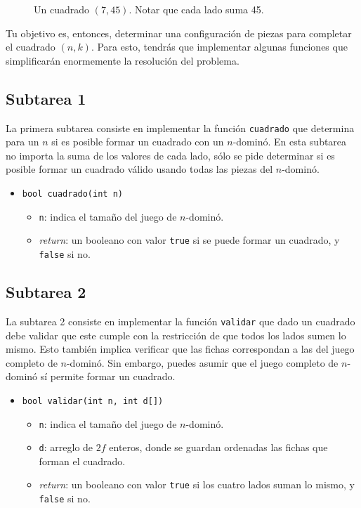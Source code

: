 \documentclass{oci}
\begin{document}
\begin{problemDescription}
\begin{figure}[ht]
 \centering
 
 \caption{Un cuadrado $(7,45)$. Notar que cada lado suma 45.}
 \label{f:cuadrado7}
\end{figure}

Tu objetivo es, entonces, determinar una configuración de piezas para completar el cuadrado $(n,k)$.
Para esto, tendrás que implementar algunas funciones que simplificarán enormemente la resolución del problema.


\end{problemDescription}

\subsection*{Subtarea 1}
La primera subtarea consiste en implementar la función \verb+cuadrado+ que determina para un $n$ si es posible formar un cuadrado con un $n$-dominó.
En esta subtarea no importa la suma de los valores de cada lado, sólo se pide determinar si es posible formar un cuadrado válido usando todas las piezas del $n$-dominó.

\begin{itemize}
 \item \verb+bool cuadrado(int n)+
 \begin{itemize}
  \item \verb+n+: indica el tamaño del juego de $n$-dominó.
  \item \emph{return}: un booleano con valor \verb+true+ si se puede formar un cuadrado, y \verb+false+ si no.
 \end{itemize}
\end{itemize}

\subsection*{Subtarea 2}
La subtarea 2 consiste en implementar la función \verb+validar+ que dado un cuadrado debe validar que este cumple con la restricción de que todos los lados sumen lo mismo.
Esto también implica verificar que las fichas correspondan a las del juego completo de $n$-dominó.
Sin embargo, puedes asumir que el juego completo de $n$-dominó sí permite formar un cuadrado.

\begin{itemize}
 \item \verb+bool validar(int n, int d[])+
 \begin{itemize}
  \item \verb+n+: indica el tamaño del juego de $n$-dominó.
  \item \verb+d+: arreglo de $2f$ enteros, donde se guardan ordenadas las fichas que forman el cuadrado.
  \item \emph{return}: un booleano con valor \verb+true+ si los cuatro lados suman lo mismo, y \verb+false+ si no.
 \end{itemize}
\end{itemize}
\end{document}
